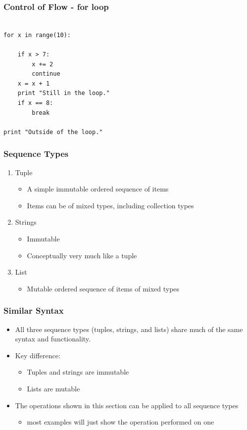 \documentclass[12pt,handout]{beamer}
\begin{document}
\begin{frame}[fragile]
\frametitle{Control of Flow - for loop}
\small{
\begin{verbatim}

for x in range(10):
    
    if x > 7:
        x += 2
        continue
    x = x + 1
    print "Still in the loop."
    if x == 8:
        break

print "Outside of the loop."
\end{verbatim}
}
\end{frame}


\begin{frame}[fragile]
\frametitle{Sequence Types}
\begin{enumerate}
\item Tuple
\begin{itemize}
\item A simple immutable ordered sequence of items
\item Items can be of mixed types, including collection types
\end{itemize}
\item Strings
\begin{itemize}
\item Immutable
\item Conceptually very much like a tuple
\end{itemize}
\item List
\begin{itemize}
\item Mutable ordered sequence of items of mixed types
\end{itemize}
\end{enumerate}
\end{frame}

\begin{frame}[fragile]
\frametitle{Similar Syntax}
\begin{itemize}
\item All three sequence types (tuples, strings, and lists)
share much of the same syntax and functionality.
\item Key difference:
\begin{itemize}
\item Tuples and strings are immutable
\item Lists are mutable
\end{itemize}
\item The operations shown in this section can be
applied to all sequence types
\begin{itemize}
\item most examples will just show the operation
performed on one
\end{itemize}
\end{itemize}
\end{frame}
\end{document}

